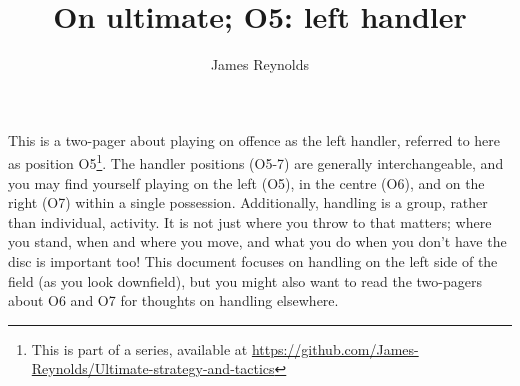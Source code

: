 \documentclass{tufte-handout}
\title{On ultimate; O5: left handler}
\author[James Reynolds]{James Reynolds}
\begin{document}
\maketitle%
This is 
a two-pager 
about
playing 
on offence 
as the left handler,  
referred to here 
as position O5\footnote{This
is part of a series, 
available at
\url{https://github.com/James-Reynolds/Ultimate-strategy-and-tactics}}. 
The handler positions (O5-7) 
are generally interchangeable, 
and you may find yourself 
playing on the left (O5), 
in the centre (O6), 
and on the right (O7) 
within 
a single possession.  
Additionally, 
handling is a 
group, 
rather than individual,
activity.
It is not just where you throw to 
that matters; 
where you stand, 
when and where you move, 
and what you do 
when you don't have the disc is 
important too!   
This document 
focuses on 
handling 
on the left 
side of the field
(as you look downfield), 
but you might also 
want to read the two-pagers about 
O6 
and O7 
for thoughts on 
handling elsewhere. 
\end{document}
